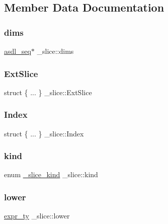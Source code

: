 \subsection{Member Data Documentation}
\mbox{\label{struct__slice_a93030a4ad534e07757aee5a01339c4e1}} 
\subsubsection{\texorpdfstring{dims}{dims}}
{\footnotesize\ttfamily \mbox{\hyperlink{structasdl__seq}{asdl\+\_\+seq}}$\ast$ \+\_\+slice\+::dims}

\mbox{\label{struct__slice_a742c6e26c3e02b543c1f40aa4bd47020}} 
\subsubsection{\texorpdfstring{ExtSlice}{ExtSlice}}
{\footnotesize\ttfamily struct \{ ... \}   \+\_\+slice\+::\+Ext\+Slice}

\mbox{\label{struct__slice_a5c77aabc98d3024ed8af2781d6cdfcf2}} 
\subsubsection{\texorpdfstring{Index}{Index}}
{\footnotesize\ttfamily struct \{ ... \}   \+\_\+slice\+::\+Index}

\mbox{\label{struct__slice_a9db6ac61022be11837644803e62dbae3}} 
\subsubsection{\texorpdfstring{kind}{kind}}
{\footnotesize\ttfamily enum \mbox{\hyperlink{_python-ast_8h_aca2c61e8b8abfd4a29eda6a47f491fcb}{\+\_\+slice\+\_\+kind}} \+\_\+slice\+::kind}

\mbox{\label{struct__slice_a6f093b55e957623c74a6331d8f937500}} 
\subsubsection{\texorpdfstring{lower}{lower}}
{\footnotesize\ttfamily \mbox{\hyperlink{_python-ast_8h_a56d3705e020a071405094a220c4592bd}{expr\+\_\+ty}} \+\_\+slice\+::lower}

